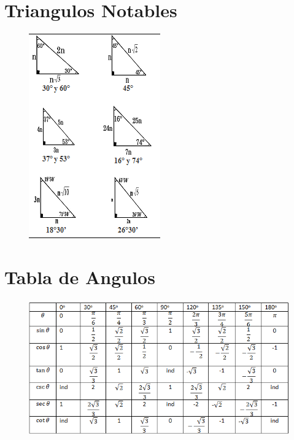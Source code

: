 \documentclass[11pt, conference]{IEEEtran}
\begin{document}
\section{Triangulos Notables}	
\begin{figure}[h]
	\begin{center}
		\includegraphics[scale=1]{2.png}
	\end{center}
\end{figure}

\section{Tabla de Angulos}
\begin{figure}[h]
	\begin{center}
		\includegraphics[scale=0.64]{1.png}
	\end{center}
\end{figure}	
	
\end{document}
